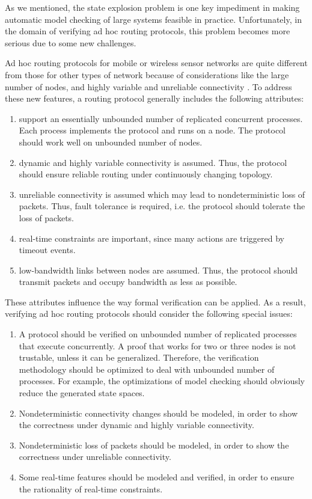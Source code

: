 \documentclass[a4paper,10pt,twocolumn]{article}
\begin{document}
As we mentioned, the state explosion problem is one key impediment in making automatic model checking of large systems feasible in practice. Unfortunately, in the domain of verifying ad hoc routing protocols, this problem becomes more serious due to some new challenges.

Ad hoc routing protocols for mobile or wireless sensor networks are quite different from those for other types of network because of considerations like the large number of nodes, and highly variable and unreliable connectivity \cite{BOG02}. To address these new features, a routing protocol generally includes the following attributes:
\begin{enumerate}
  \item support an essentially unbounded number of replicated concurrent processes. Each process implements the protocol and runs on a node. The protocol should work well on unbounded number of nodes.
  \item dynamic and highly variable connectivity is assumed. Thus, the protocol should ensure reliable routing under continuously changing topology.
  \item unreliable connectivity is assumed which may lead to nondeterministic loss of packets. Thus, fault tolerance is required, i.e. the protocol should tolerate the loss of packets.
  \item real-time constraints are important, since many actions are triggered by timeout events.
  \item low-bandwidth links between nodes are assumed. Thus, the protocol should transmit packets and occupy bandwidth as less as possible.
\end{enumerate}
These attributes influence the way formal verification can be applied. As a result, verifying ad hoc routing protocols should consider the following special issues:
\begin{enumerate}
  \item A protocol should be verified on unbounded number of replicated processes that execute concurrently. A proof that works for two or three nodes is not trustable, unless it can be generalized. Therefore, the verification methodology should be optimized to deal with unbounded number of processes. For example, the optimizations of model checking should obviously reduce the generated state spaces.
  \item Nondeterministic connectivity changes should be modeled, in order to show the correctness under dynamic and highly variable connectivity.
  \item Nondeterministic loss of packets should be modeled, in order to show the correctness under unreliable connectivity.
  \item Some real-time features should be modeled and verified, in order to ensure the rationality of real-time constraints.
\end{enumerate}
\end{document}
